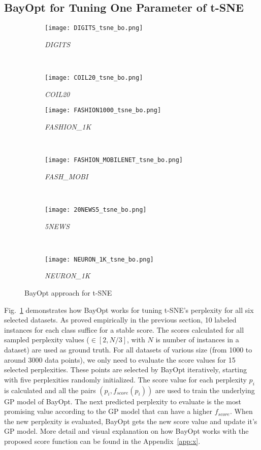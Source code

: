 \subsection{BayOpt for Tuning One Parameter of t-SNE}
\begin{figure}[]%
    \begin{subfigure}[b]{.46\linewidth}
        \centering
        \texttt{[image: DIGITS\_tsne\_bo.png]}
        \caption{\emph{DIGITS}}
    \end{subfigure}
    ~
    \begin{subfigure}[b]{.46\linewidth}
        \centering
        \texttt{[image: COIL20\_tsne\_bo.png]}
        \caption{\emph{COIL20}}
    \end{subfigure}
    \vfill
    \begin{subfigure}[b]{.46\linewidth}
        \centering
        \texttt{[image: FASHION1000\_tsne\_bo.png]}
        \caption{\emph{FASHION\_1K}}
    \end{subfigure}
    ~
    \begin{subfigure}[b]{.46\linewidth}
        \centering
        \texttt{[image: FASHION\_MOBILENET\_tsne\_bo.png]}
        \caption{\emph{FASH\_MOBI}}
    \end{subfigure}
    ~
    \vfill
    \begin{subfigure}[b]{.46\linewidth}
        \centering
        \texttt{[image: 20NEWS5\_tsne\_bo.png]}
        \caption{\emph{5NEWS}}
    \end{subfigure}
    ~
    \begin{subfigure}[b]{.46\linewidth}
        \centering
        \texttt{[image: NEURON\_1K\_tsne\_bo.png]}
        \caption{\emph{NEURON\_1K}}
    \end{subfigure}
    \caption{BayOpt approach for  t-SNE}
    \label{fig:tsne:bo:all}
\end{figure}

Fig.~\ref{fig:tsne:bo:all} demonstrates how BayOpt works for tuning t-SNE's perplexity for all six selected datasets.
As proved empirically in the previous section, 10 labeled instances for each class suffice for a stable score.
The scores calculated for all sampled perplexity values ($\in [2, N/3]$, with $N$ is number of instances in a dataset) are used as ground truth.
For all datasets of various size (from 1000 to around 3000 data points), we only need to evaluate the score values for 15 selected perplexities.
These points are selected by BayOpt iteratively, starting with five perplexities randomly initialized.
The score value for each perplexity $p_i$ is calculated and all the pairs $(p_i, f_{score}(p_i))$ are used to train the underlying GP model of BayOpt.
The next predicted perplexity to evaluate is the most promising value according to the GP model that can have a higher $f_{score}$.
When the new perplexity is evaluated, BayOpt gets the new score value and update it's GP model.
More detail and visual explanation on how BayOpt works with the proposed score function can be found in the Appendix~\ref{app:x}.

